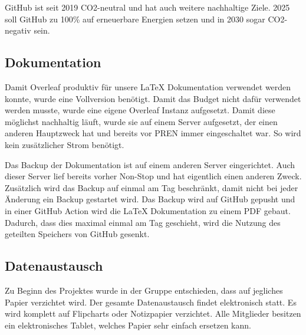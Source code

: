 GitHub ist seit 2019 CO2-neutral und hat auch weitere nachhaltige Ziele. 2025 soll GitHub zu 100\% auf erneuerbare Energien setzen und in 2030 sogar CO2-negativ sein.\cite{github-goals}







\subsection{Dokumentation}

Damit Overleaf produktiv für unsere LaTeX Dokumentation verwendet werden konnte, wurde eine Vollversion benötigt. Damit das Budget nicht dafür verwendet werden musste, wurde eine eigene Overleaf Instanz aufgesetzt. Damit diese möglichst nachhaltig läuft, wurde sie auf einem Server aufgesetzt, der einen anderen Hauptzweck hat und bereits vor PREN immer eingeschaltet war. So wird kein zusätzlicher Strom benötigt.

Das Backup der Dokumentation ist auf einem anderen Server eingerichtet. Auch dieser Server lief bereits vorher Non-Stop und hat eigentlich einen anderen Zweck. Zusätzlich wird das Backup auf einmal am Tag beschränkt, damit nicht bei jeder Änderung ein Backup gestartet wird. Das Backup wird auf GitHub gepusht und in einer GitHub Action wird die LaTeX Dokumentation zu einem PDF gebaut. Dadurch, dass dies maximal einmal am Tag geschieht, wird die Nutzung des geteilten Speichers von GitHub gesenkt.

\subsection{Datenaustausch}

Zu Beginn des Projektes wurde in der Gruppe entschieden, dass auf jegliches Papier verzichtet wird. Der gesamte Datenaustausch findet elektronisch statt. Es wird komplett auf Flipcharts oder Notizpapier verzichtet. Alle Mitglieder besitzen ein elektronisches Tablet, welches Papier sehr einfach ersetzen kann.